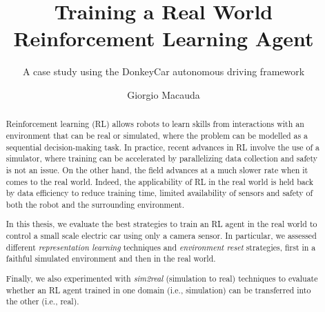 \documentclass[mscthesis]{usiinfthesis}
\title{Training a Real World Reinforcement Learning Agent} %
\subtitle{A case study using the DonkeyCar autonomous driving framework} %
\author{Giorgio Macauda} %
\begin{document}
\maketitle %

\frontmatter %

\begin{abstract}
\vspace{\fill} 
Reinforcement learning (RL) allows robots to learn skills from interactions with an environment that can be real or simulated, where the problem can be modelled as a sequential decision-making task. In practice, recent advances in RL involve the use of a simulator, where training can be accelerated by parallelizing data collection and safety is not an issue. On the other hand, the field advances at a much slower rate when it comes to the real world. Indeed, the applicability of RL in the real world is held back by data efficiency to reduce training time, limited availability of sensors and safety of both the robot and the surrounding environment.

In this thesis, we evaluate the best strategies to train an RL agent in the real world to control a small scale electric car using only a camera sensor. In particular, we assessed different \textit{representation learning} techniques and \textit{environment reset} strategies, first in a faithful simulated environment and then in the real world.

Finally, we also experimented with \textit{sim2real} (simulation to real) techniques to evaluate whether an RL agent trained in one domain (i.e., simulation) can be transferred into the other (i.e., real).
\vspace{\fill} 
\end{abstract}
\end{document}

